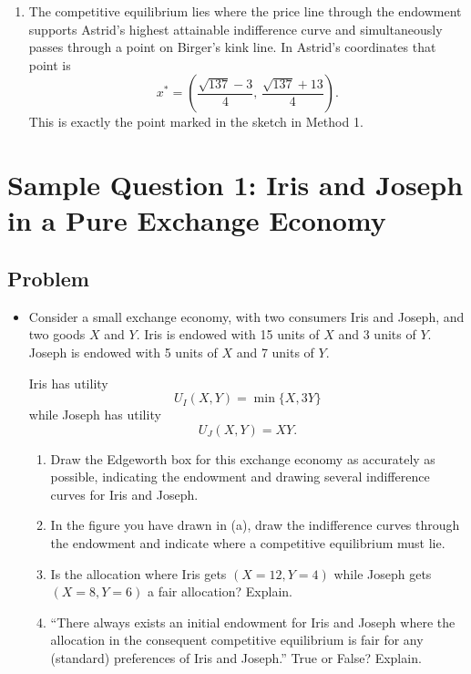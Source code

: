 \documentclass[12pt]{article}
\begin{document}
\begin{enumerate}[label=(\alph*)]
    \item
    The competitive equilibrium lies where the price line through the endowment supports Astrid's highest attainable indifference curve and simultaneously passes through a point on Birger's kink line. In Astrid's coordinates that point is
    \[
    \boxed{x^{*}=\left(\frac{\sqrt{137}-3}{4},\,\frac{\sqrt{137}+13}{4}\right).}
    \]
    This is exactly the point marked in the sketch in Method 1.
\end{enumerate}

\newpage
\section{Sample Question 1: Iris and Joseph in a Pure Exchange Economy}

\subsection{Problem}
\begin{itemize}
    \item Consider a small exchange economy, with two consumers Iris and Joseph, and two goods \(X\) and \(Y\). Iris is endowed with 15 units of \(X\) and 3 units of \(Y\). Joseph is endowed with 5 units of \(X\) and 7 units of \(Y\).

    Iris has utility
    \[
    U_I(X,Y)=\min\{X,3Y\}
    \]
    while Joseph has utility
    \[
    U_J(X,Y)=XY.
    \]

    \begin{enumerate}[label=(\alph*)]
        \item Draw the Edgeworth box for this exchange economy as accurately as possible, indicating the endowment and drawing several indifference curves for Iris and Joseph.
        \item In the figure you have drawn in (a), draw the indifference curves through the endowment and indicate where a competitive equilibrium must lie.
        \item Is the allocation where Iris gets \((X=12,Y=4)\) while Joseph gets \((X=8,Y=6)\) a fair allocation? Explain.
        \item ``There always exists an initial endowment for Iris and Joseph where the allocation in the consequent competitive equilibrium is fair for any (standard) preferences of Iris and Joseph.'' True or False? Explain.
    \end{enumerate}
\end{itemize}
\end{document}
